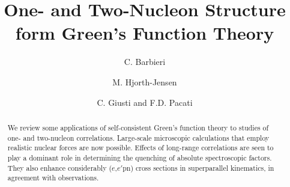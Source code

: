 \documentclass{ws-mpla}
\begin{document}

\catchline{}{}{}{}{}

\title{One- and Two-Nucleon Structure form Green's Function Theory}

\author{\footnotesize C. Barbieri}
\address{Theoretical Nuclear Physics Laboratory, RIKEN Nishina Center, \\
               2-1 Hirosawa, Wako, Saitama 351-0198 Japan
}

\author{M. Hjorth-Jensen}
\address{Department of Physics and Center of Mathematics for Applications, University of Oslo, N-0316 Oslo, Norway}

\author{C. Giusti and F.D. Pacati}
\address{Dipartimento di Fisica Nucleare e Teorica dell'Universit\`{a} degli Studi di Pavia and Istituto Nazionale di Fisica Nucleare, Sezione di Pavia, I-27100 Pavia}

\maketitle


\begin{abstract}
We review some applications of self-consistent Green's function theory
to studies of one- and two-nucleon correlations. Large-scale microscopic
calculations that employ realistic nuclear forces are now possible.
%
Effects of long-range correlations are seen to play a dominant role in
determining the quenching of absolute spectroscopic factors.
They also enhance considerably ($e$,$e'$pn) cross sections in superparallel
kinematics, in agreement with observations.

\end{abstract}


\vspace*{4mm}
\end{document}
